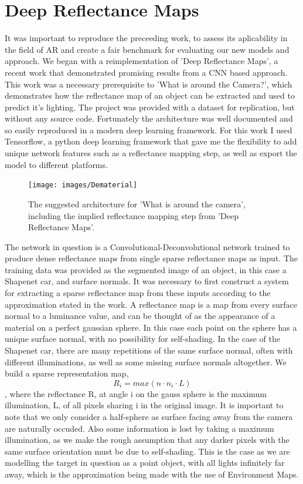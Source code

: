 \documentclass[ %
                    author={Gavin Parker},
                supervisor={Dr. Neill Campbell},
                    degree={MEng},
                     title={Deep Siamese Networks for Illumination Estimation from Stereo Images},
                  subtitle={},
                      type={research},
                      year={2018} ]{dissertation}
\begin{document}
\section{Deep Reflectance Maps}
It was important to reproduce the preceeding work, to assess its aplicability in the field of AR and create a fair benchmark for evaluating our new models and approach. We began with a reimplementation of 'Deep Reflectance Maps', a recent work that demonstrated promising results from a CNN based approach. This work was a necessary prerequisite to 'What is around the Camera?', which demonstrates how the reflectance map of an object can be extracted and used to predict it's lighting. The project was provided with a dataset for replication, but without any source code. Fortunately the architecture was well documented and so easily reproduced in a modern deep learning framework. For this work I used Tensorflow, a python deep learning framework that gave me the flexibility to add unique network features such as a reflectance mapping step, as well as export the model to different platforms.
\begin{figure}
\texttt{[image: images/Dematerial]}
\caption 
\newline
The suggested architecture for 'What is around the camera', including the implied reflectance mapping step from 'Deep Reflectance Maps'.
\end{figure}
The network in question is a Convolutional-Deconvolutional network trained to produce dense reflectance maps from single sparse reflectance maps as input. The training data was provided as the segmented image of an object, in this case a Shapenet car, and surface normals. It was necessary to first construct a system for extracting a sparse reflectance map from these inputs according to the approximation stated in the work. A reflectance map is a map from every surface normal to a luminance value, and can be thought of as the appearance of a material on a perfect gaussian sphere. In this case each point on the sphere has a unique surface normal, with no possibility for self-shading. In the case of the Shapenet car, there are many repetitions of the same surface normal, often with different illuminations, as well as some missing surface normals altogether. We build a sparse representation map,
\[ R_i = max(n\cdot n_i \cdot L)\],
where the reflectance R, at angle i on the gauss sphere is the maximum illumination, L, of all pixels sharing i in the original image. It is important to note that we only consider a half-sphere as surface facing away from the camera are naturally occuded. Also some information is lost by taking a maximum illumination, as we make the rough assumption that any darker pixels with the same surface orientation must be due to self-shading. This is the case as we are modelling the target in question as a point object, with all lights infinitely far away, which is the approximation being made with the use of Environment Maps.
\end{document}
